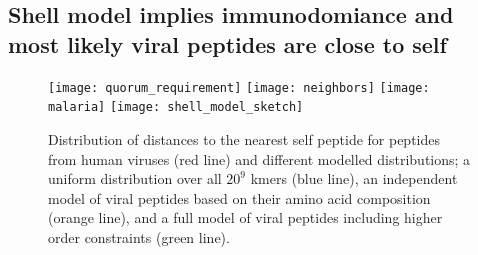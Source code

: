 \documentclass[superscriptaddress,twocolumn,pre]{revtex4}
\newcommand{\<}{\langle}
\renewcommand{\>}{\rangle}
\begin{document}





\subsection{Shell model implies immunodomiance and most likely viral peptides are close to self}

\begin{figure}
    \texttt{[image: quorum\_requirement]}
    \texttt{[image: neighbors]}
    \texttt{[image: malaria]}
    \texttt{[image: shell\_model\_sketch]}
    \caption{Distribution of distances to the nearest self peptide for peptides from human viruses (red line) and different modelled distributions; a uniform distribution over all $20^9$ kmers (blue line), an independent model of viral peptides based on their amino acid composition (orange line), and a full model of viral peptides including higher order constraints (green line).
    \label{figneighbors}
    }
\end{figure}
\end{document}
